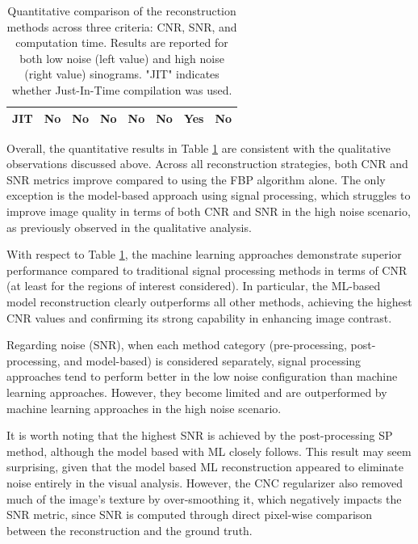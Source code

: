\documentclass{article}
\begin{document}
\begin{table}[H]
\begin{adjustbox}{width=1\textwidth}
\begin{tabular}{cc|cc|cc|cc|}
\multicolumn{1}{|c|}{\textbf{JIT}}                                                                 & No                          & \multicolumn{1}{c|}{No}                          & No            & \multicolumn{1}{c|}{No}                          & No            & \multicolumn{1}{c|}{Yes}          & No         \\ \hline
\end{tabular}
\end{adjustbox}
\caption{Quantitative comparison of the reconstruction methods across three criteria: CNR, SNR, and computation time. Results are reported for both low noise (left value) and high noise (right value) sinograms. "JIT" indicates whether Just-In-Time compilation was used.}

\label{tab:quant}

\end{table}
Overall, the quantitative results in Table \ref{tab:quant} are consistent with the qualitative observations discussed above. Across all reconstruction strategies, both CNR and SNR metrics improve compared to using the FBP algorithm alone. The only exception is the model-based approach using signal processing, which struggles to improve image quality in terms of both CNR and SNR in the high noise scenario, as previously observed in the qualitative analysis.
\medskip

With respect to Table \ref{tab:quant}, the machine learning approaches demonstrate superior performance compared to traditional signal processing methods in terms of CNR (at least for the regions of interest considered). In particular, the ML-based model reconstruction clearly outperforms all other methods, achieving the highest CNR values and confirming its strong capability in enhancing image contrast.
\medskip

Regarding noise (SNR), when each method category (pre-processing, post-processing, and model-based) is considered separately, signal processing  approaches tend to perform better in the low noise configuration than machine learning approaches. However, they become limited and are outperformed by machine learning approaches in the high noise scenario.


It is worth noting that the highest SNR is achieved by the post-processing SP method, although the model based with ML closely follows. This result may seem surprising, given that the model based ML reconstruction appeared to eliminate noise entirely in the visual analysis. However, the CNC regularizer also removed much of the image’s texture by over-smoothing it, which negatively impacts the SNR metric, since SNR is computed through direct pixel-wise comparison between the reconstruction and the ground truth.
\medskip
\end{document}
